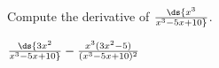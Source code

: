 \begin{enumialphparenastyle}
%
%
%
%
%
%

\begin{ex} 
Compute the derivative of $\ds {x^3\over x^3-5x+10}$.
\begin{sol} 
$\ds {3x^2\over x^3-5x+10}-{x^3(3x^2-5)\over (x^3-5x+10)^2}$
\end{sol}
\end{ex}


\end{enumialphparenastyle}
